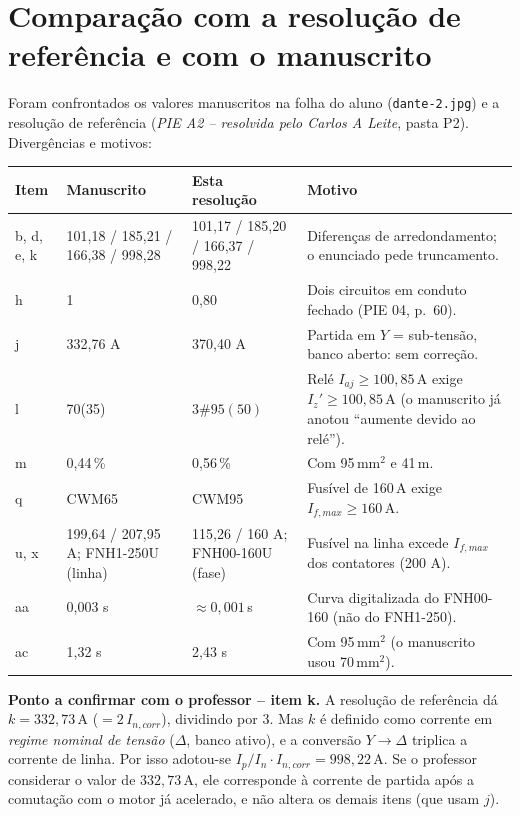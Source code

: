 \documentclass[11pt,a4paper]{article}
\begin{document}
\section{Compara\c{c}\~ao com a resolu\c{c}\~ao de refer\^encia e com o manuscrito}

Foram confrontados os valores manuscritos na folha do aluno (\texttt{dante-2.jpg}) e a resolu\c{c}\~ao de refer\^encia (\emph{PIE A2 -- resolvida pelo Carlos A Leite}, pasta P2). Diverg\^encias e motivos:

\begin{tabularx}{\linewidth}{@{}p{2.3cm}p{4.4cm}p{4.4cm}X@{}}
\toprule
Item & Manuscrito & Esta resolu\c{c}\~ao & Motivo \\
\midrule
b, d, e, k & 101{,}18 / 185{,}21 / 166{,}38 / 998{,}28 & 101{,}17 / 185{,}20 / 166{,}37 / 998{,}22 & Diferen\c{c}as de arredondamento; o enunciado pede truncamento. \\
h & 1 & 0{,}80 & Dois circuitos em conduto fechado (PIE 04, p.~60). \\
j & 332{,}76 A & 370{,}40 A & Partida em $Y$ = sub-tens\~ao, banco aberto: sem corre\c{c}\~ao. \\
l & 70(35) & $3\#95(50)$ & Rel\'e $I_{aj}\ge 100{,}85$\,A exige $I_z'\ge 100{,}85$\,A (o manuscrito j\'a anotou ``aumente devido ao rel\'e''). \\
m & 0{,}44\,\% & 0{,}56\,\% & Com 95\,mm$^2$ e 41\,m. \\
q & CWM65 & CWM95 & Fus\'ivel de 160\,A exige $I_{f,max}\ge 160$\,A. \\
u, x & 199{,}64 / 207{,}95 A; FNH1-250U (linha) & 115{,}26 / 160 A; FNH00-160U (fase) & Fus\'ivel na linha excede $I_{f,max}$ dos contatores (200 A). \\
aa & 0{,}003 s & $\approx 0{,}001$\,s & Curva digitalizada do FNH00-160 (n\~ao do FNH1-250). \\
ac & 1{,}32 s & 2{,}43 s & Com 95\,mm$^2$ (o manuscrito usou 70\,mm$^2$). \\
\bottomrule
\end{tabularx}

\medskip
\textbf{Ponto a confirmar com o professor -- item k.} A resolu\c{c}\~ao de refer\^encia d\'a $k=332{,}73$\,A ($=2\,I_{n,corr}$), dividindo por 3. Mas $k$ \'e definido como corrente em \emph{regime nominal de tens\~ao} ($\Delta$, banco ativo), e a convers\~ao $Y\to\Delta$ triplica a corrente de linha. Por isso adotou-se $I_p/I_n\cdot I_{n,corr}=998{,}22$\,A. Se o professor considerar o valor de $332{,}73$\,A, ele corresponde \`a corrente de partida ap\'os a comuta\c{c}\~ao com o motor j\'a acelerado, e n\~ao altera os demais itens (que usam $j$).
\end{document}
